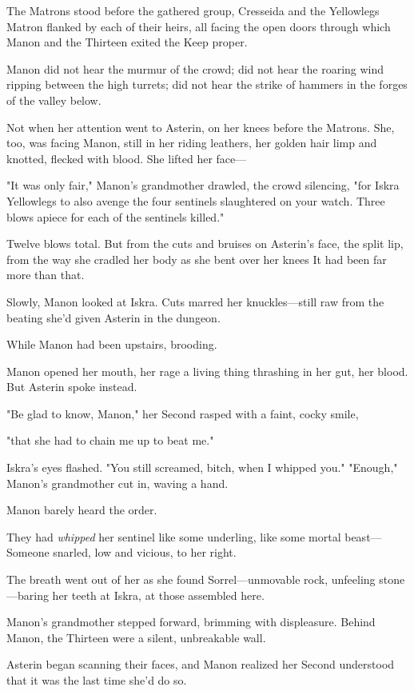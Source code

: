 The Matrons stood before the gathered group, Cresseida and the Yellowlegs Matron flanked by each of their heirs, all facing the open doors through which Manon and the Thirteen exited the Keep proper.

Manon did not hear the murmur of the crowd; did not hear the roaring wind ripping between the high turrets; did not hear the strike of hammers in the forges of the valley below.

Not when her attention went to Asterin, on her knees before the Matrons. She, too, was facing Manon, still in her riding leathers, her golden hair limp and knotted, flecked with blood. She lifted her face---

"It was only fair," Manon's grandmother drawled, the crowd silencing, "for Iskra Yellowlegs to also avenge the four sentinels slaughtered on your watch. Three blows apiece for each of the sentinels killed."

Twelve blows total. But from the cuts and bruises on Asterin's face, the split lip, from the way she cradled her body as she bent over her knees
 It had been far more than that.

Slowly, Manon looked at Iskra. Cuts marred her knuckles---still raw from the beating she'd given Asterin in the dungeon.

While Manon had been upstairs, brooding.

Manon opened her mouth, her rage a living thing thrashing in her gut, her blood. But Asterin spoke instead.

"Be glad to know, Manon," her Second rasped with a faint, cocky smile,

"that she had to chain me up to beat me."

Iskra's eyes flashed. "You still screamed, bitch, when I whipped you." "Enough," Manon's grandmother cut in, waving a hand.

Manon barely heard the order.

They had \emph{whipped} her sentinel like some underling, like some mortal beast--- Someone snarled, low and vicious, to her right.

The breath went out of her as she found Sorrel---unmovable rock, unfeeling stone---baring her teeth at Iskra, at those assembled here.

Manon's grandmother stepped forward, brimming with displeasure. Behind Manon, the Thirteen were a silent, unbreakable wall.

Asterin began scanning their faces, and Manon realized her Second understood that it was the last time she'd do so.

